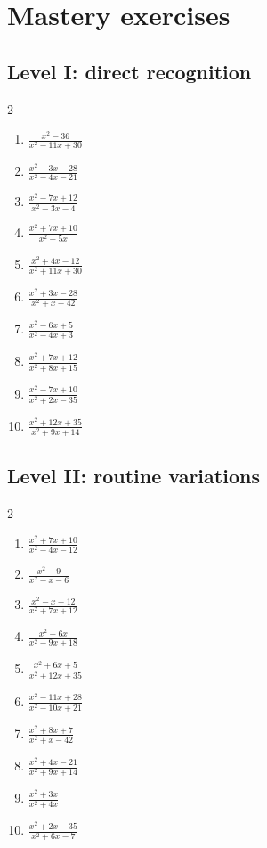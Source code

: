 \documentclass[11pt,oneside]{book}
\begin{document}
\section{Mastery exercises}
\subsection*{Level I: direct recognition}
\begin{multicols}{2}
\begin{enumerate}[leftmargin=*,label=\textbf{\arabic*.},itemsep=0.65\baselineskip]
\item $\displaystyle \frac{x^{2} - 36}{x^{2} - 11 x + 30}$
\item $\displaystyle \frac{x^{2} - 3 x - 28}{x^{2} - 4 x - 21}$
\item $\displaystyle \frac{x^{2} - 7 x + 12}{x^{2} - 3 x - 4}$
\item $\displaystyle \frac{x^{2} + 7 x + 10}{x^{2} + 5 x}$
\item $\displaystyle \frac{x^{2} + 4 x - 12}{x^{2} + 11 x + 30}$
\item $\displaystyle \frac{x^{2} + 3 x - 28}{x^{2} + x - 42}$
\item $\displaystyle \frac{x^{2} - 6 x + 5}{x^{2} - 4 x + 3}$
\item $\displaystyle \frac{x^{2} + 7 x + 12}{x^{2} + 8 x + 15}$
\item $\displaystyle \frac{x^{2} - 7 x + 10}{x^{2} + 2 x - 35}$
\item $\displaystyle \frac{x^{2} + 12 x + 35}{x^{2} + 9 x + 14}$
\end{enumerate}
\end{multicols}
\subsection*{Level II: routine variations}
\begin{multicols}{2}
\begin{enumerate}[leftmargin=*,label=\textbf{\arabic*.},itemsep=0.65\baselineskip]
\item $\displaystyle \frac{x^{2} + 7 x + 10}{x^{2} - 4 x - 12}$
\item $\displaystyle \frac{x^{2} - 9}{x^{2} - x - 6}$
\item $\displaystyle \frac{x^{2} - x - 12}{x^{2} + 7 x + 12}$
\item $\displaystyle \frac{x^{2} - 6 x}{x^{2} - 9 x + 18}$
\item $\displaystyle \frac{x^{2} + 6 x + 5}{x^{2} + 12 x + 35}$
\item $\displaystyle \frac{x^{2} - 11 x + 28}{x^{2} - 10 x + 21}$
\item $\displaystyle \frac{x^{2} + 8 x + 7}{x^{2} + x - 42}$
\item $\displaystyle \frac{x^{2} + 4 x - 21}{x^{2} + 9 x + 14}$
\item $\displaystyle \frac{x^{2} + 3 x}{x^{2} + 4 x}$
\item $\displaystyle \frac{x^{2} + 2 x - 35}{x^{2} + 6 x - 7}$
\end{enumerate}
\end{multicols}
\end{document}
